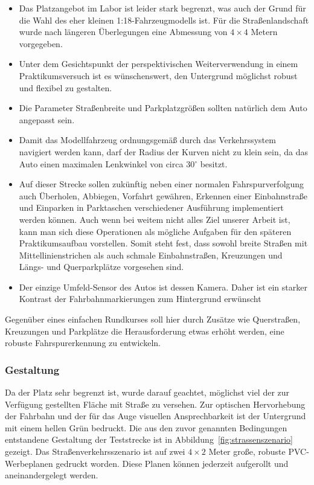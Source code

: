 \begin{itemize}
	\item Das Platzangebot im Labor ist leider stark begrenzt, was auch der Grund für die Wahl des eher kleinen 1:18-Fahrzeugmodells ist. Für die Straßenlandschaft wurde nach längeren Überlegungen eine Abmessung von \(4 \times 4\) Metern vorgegeben.
	
	\item Unter dem Gesichtspunkt der perspektivischen Weiterverwendung in einem Praktikumsversuch ist es wünschenswert, den Untergrund möglichst robust und flexibel zu gestalten.
	
	\item Die Parameter Straßenbreite und Parkplatzgrößen sollten natürlich dem Auto angepasst sein. 
	
	\item Damit das Modellfahrzeug ordnungsgemäß durch das Verkehrssystem navigiert werden kann, darf der Radius der Kurven nicht zu klein sein, da das Auto einen maximalen Lenkwinkel von circa 30\(^\circ\) besitzt. 
	
	\item Auf dieser Strecke sollen zukünftig neben einer normalen Fahrspurverfolgung auch Überholen, Abbiegen, Vorfahrt gewähren, Erkennen einer Einbahnstraße und Einparken in Parktaschen verschiedener Ausführung implementiert werden können. Auch wenn bei weitem nicht alles Ziel unserer Arbeit ist, kann man sich diese Operationen als mögliche Aufgaben für den späteren Praktikumsaufbau vorstellen. Somit steht fest, dass sowohl breite Straßen mit Mittellinienstrichen als auch schmale Einbahnstraßen, Kreuzungen und Längs- und Querparkplätze vorgesehen sind.
	
	\item Der einzige Umfeld-Sensor des Autos ist dessen Kamera. Daher ist ein starker Kontrast der Fahrbahnmarkierungen zum Hintergrund erwünscht
\end{itemize}

Gegenüber eines einfachen Rundkurses soll hier durch Zusätze wie Querstraßen, Kreuzungen und Parkplätze die Herausforderung etwas erhöht werden, eine robuste Fahrspurerkennung zu entwickeln. 

\subsubsection{Gestaltung}

Da der Platz sehr begrenzt ist, wurde darauf geachtet, möglichst viel der zur Verfügung gestellten Fläche mit Straße zu versehen. Zur optischen Hervorhebung der Fahrbahn und der für das Auge visuellen Ansprechbarkeit ist der Untergrund mit einem hellen Grün bedruckt. Die aus den zuvor genannten Bedingungen entstandene Gestaltung der Teststrecke ist in Abbildung~\ref{fig:strassenszenario} gezeigt. Das Straßenverkehrsszenario ist auf zwei \(4 \times 2\) Meter große, robuste PVC-Werbeplanen gedruckt worden. Diese Planen können jederzeit aufgerollt und aneinandergelegt werden.

